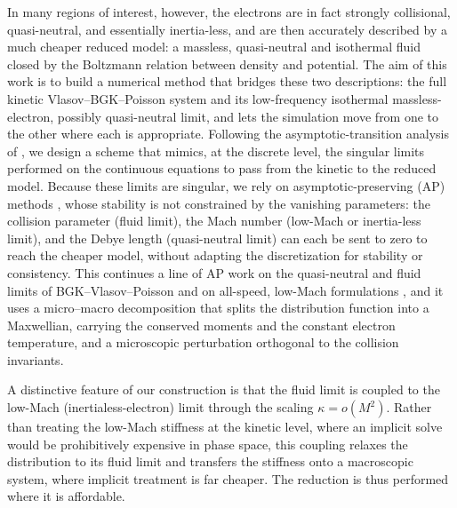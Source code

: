 \documentclass[pdflatex,final,10pt]{article}
\begin{document}
In many regions of interest, however, the electrons are in fact strongly collisional, quasi-neutral, and essentially inertia-less, and are then accurately described by a much cheaper reduced model: a massless, quasi-neutral and isothermal fluid closed by the Boltzmann relation between density and potential. The aim of this work is to build a numerical method that bridges these two descriptions: the full kinetic Vlasov--BGK--Poisson system and its low-frequency isothermal massless-electron, possibly quasi-neutral limit, and lets the simulation move from one to the other where each is appropriate. Following the asymptotic-transition analysis of \cite{crestetto2020bridging}, we design a scheme that mimics, at the discrete level, the singular limits performed on the continuous equations to pass from the kinetic to the reduced model. Because these limits are singular, we rely on asymptotic-preserving (AP) methods \cite{jin1999efficient,jin2010asymptotic,degond2017asymptotic}, whose stability is not constrained by the vanishing parameters: the collision parameter (fluid limit), the Mach number (low-Mach or inertia-less limit), and the Debye length
(quasi-neutral limit) can each be sent to zero to reach the cheaper model, without adapting the discretization for stability or consistency. This continues a line of AP work on the quasi-neutral and fluid limits of BGK--Vlasov--Poisson \cite{crouseilles2016multiscale,crispel2007asymptotic,degond2010asymptotic} and on all-speed, low-Mach formulations \cite{cordier2012asymptotic,dimarco2018second}, and it uses a micro--macro decomposition \cite{lemou2008new,bennoune2008uniformly} that splits the distribution function into a Maxwellian, carrying the conserved moments and the constant electron temperature, and a microscopic perturbation orthogonal to the collision invariants.

A distinctive feature of our construction is that the fluid limit is coupled to the low-Mach (inertialess-electron) limit through the scaling $\kappa = o(M^2)$. Rather than treating the low-Mach stiffness at the kinetic level, where an implicit solve would be prohibitively expensive in phase space, this coupling relaxes the distribution to its fluid limit and transfers the stiffness onto a macroscopic system, where implicit treatment is far cheaper. The reduction is thus performed where it is affordable.
\end{document}
